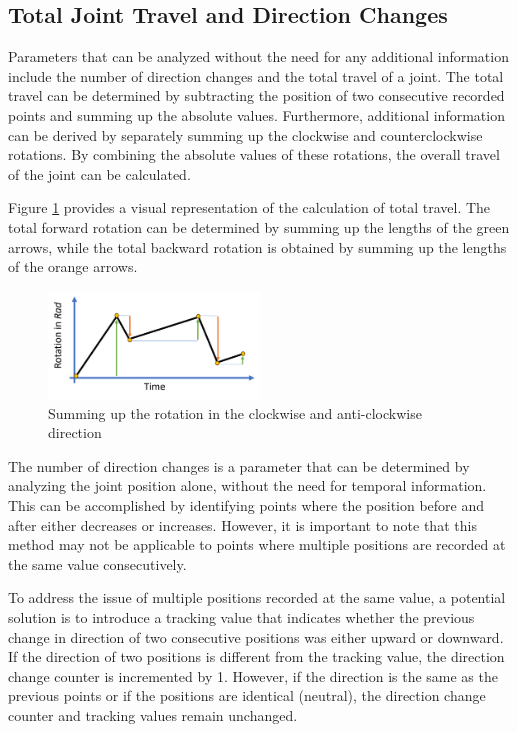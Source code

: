 
\subsection{Total Joint Travel and Direction Changes}
Parameters that can be analyzed without the need for any additional information include the number of direction changes and the total travel of a joint. The total travel can be determined by subtracting the position of two consecutive recorded points and summing up the absolute values. Furthermore, additional information can be derived by separately summing up the clockwise and counterclockwise rotations. By combining the absolute values of these rotations, the overall travel of the joint can be calculated.

Figure \ref{travel} provides a visual representation of the calculation of total travel. The total forward rotation can be determined by summing up the lengths of the green arrows, while the total backward rotation is obtained by summing up the lengths of the orange arrows.

\begin{figure}[H]
	\centerline{\includegraphics[width=0.5\textwidth]{figures/travel.png}}
	\caption{Summing up the rotation in the clockwise and anti-clockwise direction }
	\label{travel}
\end{figure}

The number of direction changes is a parameter that can be determined by analyzing the joint position alone, without the need for temporal information. This can be accomplished by identifying points where the position before and after either decreases or increases. However, it is important to note that this method may not be applicable to points where multiple positions are recorded at the same value consecutively.

To address the issue of multiple positions recorded at the same value, a potential solution is to introduce a tracking value that indicates whether the previous change in direction of two consecutive positions was either upward or downward. If the direction of two positions is different from the tracking value, the direction change counter is incremented by 1. However, if the direction is the same as the previous points or if the positions are identical (neutral), the direction change counter and tracking values remain unchanged.

